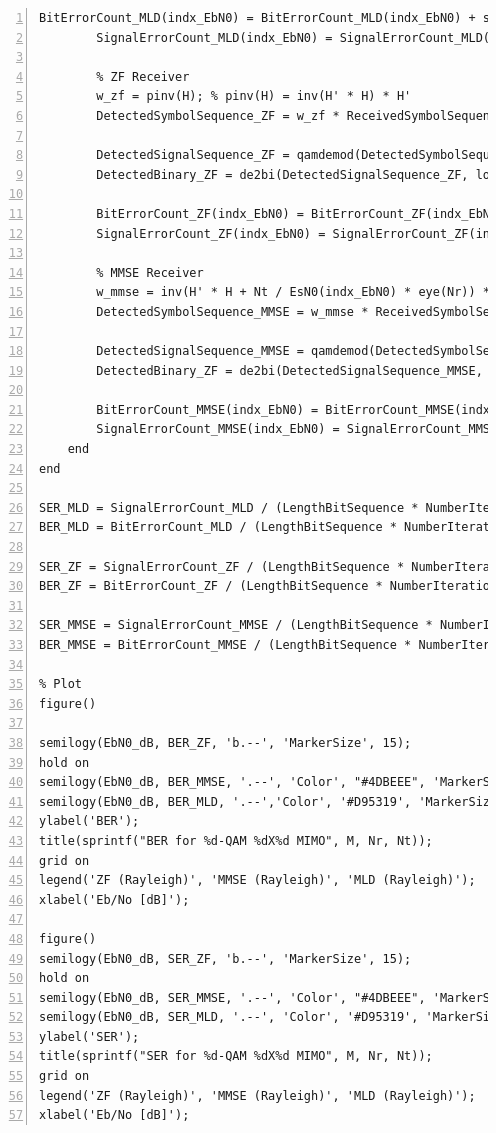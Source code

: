 \documentclass{article}
\begin{document}
\begin{lstlisting}[style=Matlab-editor, frame=single, numbers=left,]
        BitErrorCount_MLD(indx_EbN0) = BitErrorCount_MLD(indx_EbN0) + sum(SignalBinary~=DetectedBinary_MLD, 'all');
        SignalErrorCount_MLD(indx_EbN0) = SignalErrorCount_MLD(indx_EbN0) + sum(SignalSequence~=DetectedSequence_MLD, 'all');
        
        % ZF Receiver
        w_zf = pinv(H); % pinv(H) = inv(H' * H) * H'
        DetectedSymbolSequence_ZF = w_zf * ReceivedSymbolSequence; % Detection (Zero-Forcing: y / h)
        
        DetectedSignalSequence_ZF = qamdemod(DetectedSymbolSequence_ZF*NormalizationFactor, M); % Detection
        DetectedBinary_ZF = de2bi(DetectedSignalSequence_ZF, log2(M), 'left-msb');
        
        BitErrorCount_ZF(indx_EbN0) = BitErrorCount_ZF(indx_EbN0) + sum(SignalBinary~=DetectedBinary_ZF, 'all');
        SignalErrorCount_ZF(indx_EbN0) = SignalErrorCount_ZF(indx_EbN0) + sum(SignalSequence~=DetectedSignalSequence_ZF, 'all');
        
        % MMSE Receiver
        w_mmse = inv(H' * H + Nt / EsN0(indx_EbN0) * eye(Nr)) * H';
        DetectedSymbolSequence_MMSE = w_mmse * ReceivedSymbolSequence; % Detection (Zero-Forcing: y / h)
        
        DetectedSignalSequence_MMSE = qamdemod(DetectedSymbolSequence_MMSE*NormalizationFactor, M); % Detection
        DetectedBinary_ZF = de2bi(DetectedSignalSequence_MMSE, log2(M), 'left-msb');
        
        BitErrorCount_MMSE(indx_EbN0) = BitErrorCount_MMSE(indx_EbN0) + sum(SignalBinary~=DetectedBinary_ZF, 'all');
        SignalErrorCount_MMSE(indx_EbN0) = SignalErrorCount_MMSE(indx_EbN0) + sum(SignalSequence~=DetectedSignalSequence_MMSE, 'all');
    end
end

SER_MLD = SignalErrorCount_MLD / (LengthBitSequence * NumberIteration);
BER_MLD = BitErrorCount_MLD / (LengthBitSequence * NumberIteration);

SER_ZF = SignalErrorCount_ZF / (LengthBitSequence * NumberIteration);
BER_ZF = BitErrorCount_ZF / (LengthBitSequence * NumberIteration);

SER_MMSE = SignalErrorCount_MMSE / (LengthBitSequence * NumberIteration);
BER_MMSE = BitErrorCount_MMSE / (LengthBitSequence * NumberIteration);

% Plot
figure()

semilogy(EbN0_dB, BER_ZF, 'b.--', 'MarkerSize', 15);
hold on
semilogy(EbN0_dB, BER_MMSE, '.--', 'Color', "#4DBEEE", 'MarkerSize', 15);
semilogy(EbN0_dB, BER_MLD, '.--','Color', '#D95319', 'MarkerSize', 15);
ylabel('BER');
title(sprintf("BER for %d-QAM %dX%d MIMO", M, Nr, Nt));
grid on
legend('ZF (Rayleigh)', 'MMSE (Rayleigh)', 'MLD (Rayleigh)');
xlabel('Eb/No [dB]');

figure()
semilogy(EbN0_dB, SER_ZF, 'b.--', 'MarkerSize', 15);
hold on
semilogy(EbN0_dB, SER_MMSE, '.--', 'Color', "#4DBEEE", 'MarkerSize', 15); 
semilogy(EbN0_dB, SER_MLD, '.--', 'Color', '#D95319', 'MarkerSize', 15);
ylabel('SER');
title(sprintf("SER for %d-QAM %dX%d MIMO", M, Nr, Nt));
grid on
legend('ZF (Rayleigh)', 'MMSE (Rayleigh)', 'MLD (Rayleigh)');
xlabel('Eb/No [dB]');
\end{lstlisting}
\end{document}

